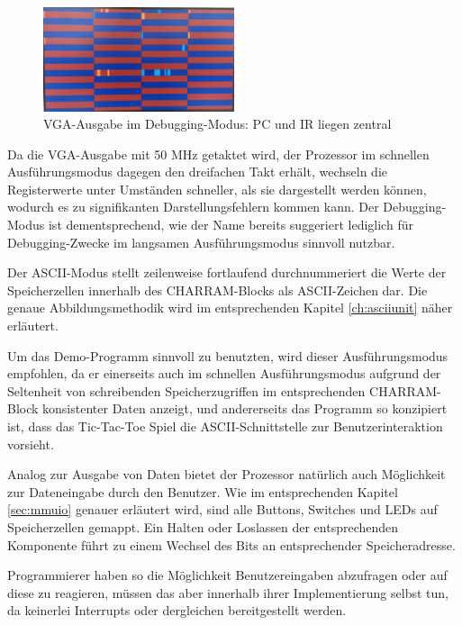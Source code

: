 \begin{figure}[H]
	\centering
		\includegraphics[width=0.5\textwidth]{debugui.png}
	\caption{VGA-Ausgabe im Debugging-Modus: PC und IR liegen zentral}
	\label{fig:debuggingui}
\end{figure}

Da die VGA-Ausgabe mit 50 MHz getaktet wird, der Prozessor im schnellen Ausf\"uhrungsmodus dagegen den dreifachen Takt erh\"alt, wechseln die Registerwerte unter Umst\"anden schneller, als sie dargestellt werden k\"onnen, wodurch es zu signifikanten Darstellungsfehlern kommen kann. Der Debugging-Modus ist dementsprechend, wie der Name bereits suggeriert lediglich f\"ur Debugging-Zwecke im langsamen Ausf\"uhrungsmodus sinnvoll nutzbar.

Der ASCII-Modus stellt zeilenweise fortlaufend durchnummeriert die Werte der Speicherzellen innerhalb des CHARRAM-Blocks als ASCII-Zeichen dar. Die genaue Abbildungsmethodik wird im entsprechenden Kapitel \ref{ch:asciiunit} n\"aher erl\"autert.

Um das Demo-Programm sinnvoll zu benutzten, wird dieser Ausf\"uhrungsmodus empfohlen, da er einerseits auch im schnellen Ausf\"uhrungsmodus aufgrund der Seltenheit von schreibenden Speicherzugriffen im entsprechenden CHARRAM-Block konsistenter Daten anzeigt, und andererseits das Programm so konzipiert ist, dass das Tic-Tac-Toe Spiel die ASCII-Schnittstelle zur Benutzerinteraktion vorsieht.


Analog zur Ausgabe von Daten bietet der Prozessor nat\"urlich auch M\"oglichkeit zur Dateneingabe durch den Benutzer. Wie im entsprechenden Kapitel \ref{sec:mmuio} genauer erläutert wird, sind alle Buttons, Switches und LEDs auf Speicherzellen gemappt. Ein Halten oder Loslassen der entsprechenden Komponente f\"uhrt zu einem Wechsel des Bits an entsprechender Speicheradresse.

Programmierer haben so die M\"oglichkeit Benutzereingaben abzufragen oder auf diese zu reagieren, m\"ussen das aber innerhalb ihrer Implementierung selbst tun, da keinerlei Interrupts oder dergleichen bereitgestellt werden.


